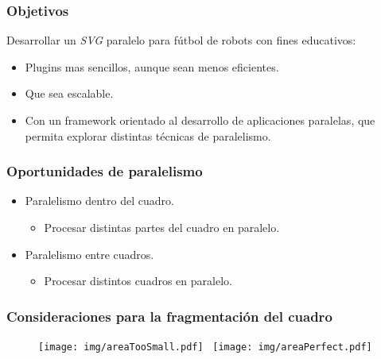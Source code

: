 \documentclass[11pt,a4paper,spanish]{beamer}
\begin{document}
\begin{frame}

\frametitle{Objetivos}

Desarrollar un \emph{SVG} paralelo para fútbol de robots con fines educativos:

\begin{itemize}

	\item Plugins mas sencillos, aunque sean menos eficientes.

	\item Que sea escalable.

	\item Con un framework orientado al desarrollo de aplicaciones
		paralelas, que permita explorar distintas técnicas de
		paralelismo.

\end{itemize}

\end{frame}

\begin{frame}

\frametitle{Oportunidades de paralelismo}

\begin{itemize}

	\item Paralelismo dentro del cuadro.

\begin{itemize}

	\item Procesar distintas partes del cuadro en paralelo.

\end{itemize}

	\item Paralelismo entre cuadros.

\begin{itemize}

	\item Procesar distintos cuadros en paralelo.

\end{itemize}

\end{itemize}

\end{frame}

\begin{frame}

\frametitle{Consideraciones para la fragmentación del cuadro}

\begin{figure}[h]

	\centering

	\texttt{[image: img/areaTooSmall.pdf]}~
	\texttt{[image: img/areaPerfect.pdf]}

\end{figure}

\end{frame}
\end{document}
